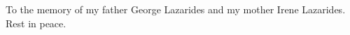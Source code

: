 \begin{dedication}
To the memory of my father George Lazarides and my mother Irene Lazarides. Rest in peace.
\end{dedication}